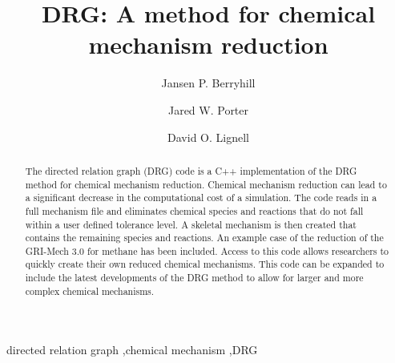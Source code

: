 \documentclass[preprint,12pt, a4paper]{elsarticle}
\begin{document}
\begin{frontmatter}

\title{DRG: A method for chemical mechanism reduction}
\author[byu]{Jansen P. Berryhill}
\author[byu]{Jared W. Porter}
\author[byu]{David O. Lignell}

\address[byu]{Chemical Engineering Department, Brigham Young University, Provo, UT 84602, USA}


\begin{abstract}
The directed relation graph (DRG) code is a C++ implementation of the DRG method for chemical mechanism reduction. Chemical mechanism reduction can lead to a significant decrease in the computational cost of a simulation. The code reads in a full mechanism file and eliminates chemical species and reactions that do not fall within a user defined tolerance level. A skeletal mechanism is then created that contains the remaining species and reactions. An example case of the reduction of the GRI-Mech 3.0 for methane has been included. Access to this code allows researchers to quickly create their own reduced chemical mechanisms. This code can be expanded to include the latest developments of the DRG method to allow for larger and more complex chemical mechanisms. 

\end{abstract}

\begin{keyword} 
directed relation graph \sep chemical mechanism \sep DRG
\end{keyword}
\end{frontmatter}     

\end{document}

